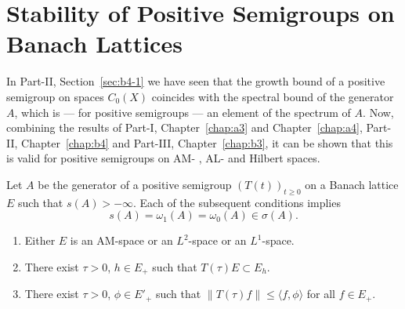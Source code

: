 \section{Stability of Positive Semigroups on Banach Lattices}\label{sec:c4-1} 
\hspace{1cm}{\Large by Günther Greiner and Frank Neubrander}
\vspace{.5cm}
\newline
In Part-II, Section~\ref{sec:b4-1} we have seen that the growth bound of a positive semigroup on spaces $C_{0}(X)$ coincides with the spectral bound of the generator $A$, which is --- for positive semigroups --- an element of the spectrum of\/ $A$.
Now, combining the results of Part-I, Chapter~\ref{chap:a3} and Chapter~\ref{chap:a4},  
Part-II, Chapter~\ref{chap:b4} and Part-III, Chapter~\ref{chap:b3},  it can be shown that this is valid for positive semigroups on AM- , AL- and Hilbert spaces.
\begin{theorem}\label{thm:c4-1.1}
Let $A$ be the generator of a positive semigroup $(T(t))_{t \geq 0}$ on a Banach lattice $E$ such that $s(A) > -\infty$.
Each of the subsequent conditions implies
\begin{equation*}\label{eq:c4-1.0-kgk}
s(A) = \omega_{1}(A) = \omega_{0}(A) \in \sigma(A) .
\end{equation*}
\begin{enumerate}[\upshape (i)] 
    \item \label{thm:c4-1.1-1}
    Either $E$ is an AM-space or an $L^{2}$-space or an $L^{1}$-space.
    
    \item \label{thm:c4-1.1-2}
    There exist $\tau > 0$, $h \in E_{+}$ such that $T(\tau)E \subset E_{h}$.
    
    \item \label{thm:c4-1.1-3}
    There exist $\tau > 0$, $\phi \in E'_{+}$ such that $\|T(\tau)f\| \leq \langle f,\phi\rangle$ for all $f \in E_{+}$.
\end{enumerate}
\end{theorem}
